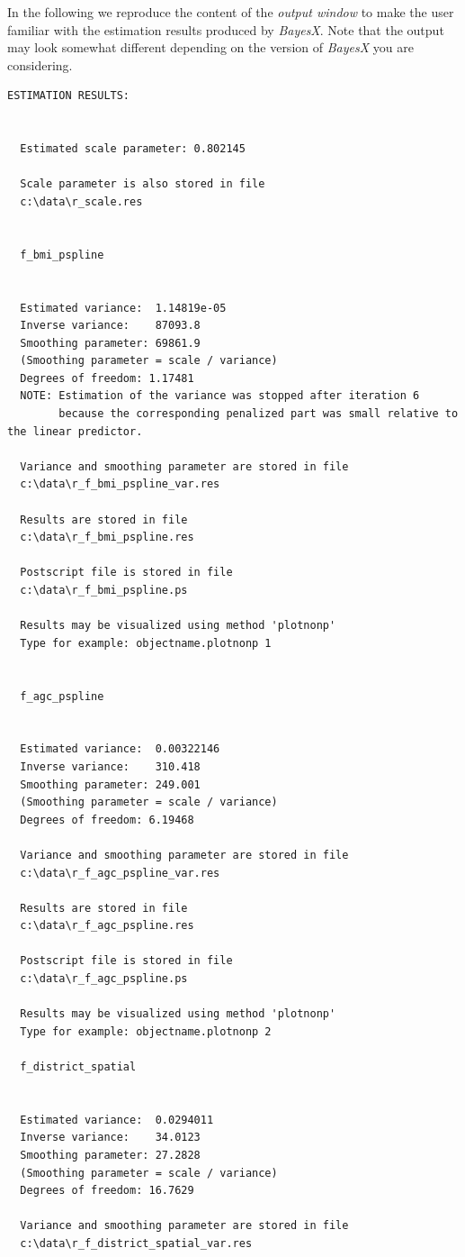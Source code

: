 In the following we reproduce the content of the {\it output window} to make the user familiar with the estimation results
produced by {\it BayesX}. Note that the output may look somewhat different depending on the version of {\it BayesX} you are
considering.

\footnotesize
\begin{verbatim}
ESTIMATION RESULTS:


  Estimated scale parameter: 0.802145

  Scale parameter is also stored in file
  c:\data\r_scale.res


  f_bmi_pspline


  Estimated variance:  1.14819e-05
  Inverse variance:    87093.8
  Smoothing parameter: 69861.9
  (Smoothing parameter = scale / variance)
  Degrees of freedom: 1.17481
  NOTE: Estimation of the variance was stopped after iteration 6
        because the corresponding penalized part was small relative to the linear predictor.

  Variance and smoothing parameter are stored in file
  c:\data\r_f_bmi_pspline_var.res

  Results are stored in file
  c:\data\r_f_bmi_pspline.res

  Postscript file is stored in file
  c:\data\r_f_bmi_pspline.ps

  Results may be visualized using method 'plotnonp'
  Type for example: objectname.plotnonp 1


  f_agc_pspline


  Estimated variance:  0.00322146
  Inverse variance:    310.418
  Smoothing parameter: 249.001
  (Smoothing parameter = scale / variance)
  Degrees of freedom: 6.19468

  Variance and smoothing parameter are stored in file
  c:\data\r_f_agc_pspline_var.res

  Results are stored in file
  c:\data\r_f_agc_pspline.res

  Postscript file is stored in file
  c:\data\r_f_agc_pspline.ps

  Results may be visualized using method 'plotnonp'
  Type for example: objectname.plotnonp 2

  f_district_spatial


  Estimated variance:  0.0294011
  Inverse variance:    34.0123
  Smoothing parameter: 27.2828
  (Smoothing parameter = scale / variance)
  Degrees of freedom: 16.7629

  Variance and smoothing parameter are stored in file
  c:\data\r_f_district_spatial_var.res


\end{verbatim}
